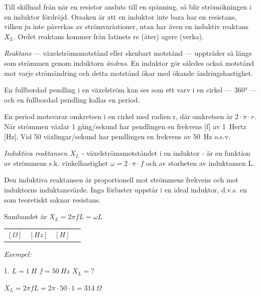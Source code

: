 Till skillnad från när en resistor ansluts till en spänning, så blir
strömökningen i en induktor fördröjd. Orsaken är att en induktor inte bara har
en resistans, vilken ju inte påverkas av strömvariationer, utan har även en
induktiv reaktans \(X_L\). Ordet reaktans kommer från latinets re (åter) agere
(verka).

\emph{Reaktans} --- växelströmsmotstånd eller skenbart motstånd --- uppträder så
länge som strömmen genom induktorn \emph{ändras}. En induktor gör således också
motstånd mot varje strömändring och detta motstånd ökar med ökande
ändringshastighet.

En fullbordad pendling i en växelström kan ses som ett varv i en cirkel --- 360° ---
och en fullbordad pendling kallas en period.

En period motsvarar omkretsen i en cirkel med radien r, där omkretsen är
\(2 \cdot π \cdot r\). När strömmen växlar 1 gång/sekund har
pendlingen en frekvens [f] av 1~Hertz [Hz]. Vid 50 växlingar/sekund har
pendlingen en frekvens av 50~Hz o.s.v.

\emph{Induktiva reaktansen \(X_L\)} - växelströmsmotståndet i en induktor - är
en funktion av strömmens s.k. vinkelhastighet \(\omega = 2 \cdot π \cdot f\) och
av storheten av induktansen L.

Den induktiva reaktansen är proportionell mot strömmens frekvens och mot
induktorns induktansvärde. Inga förluster uppstår i en ideal induktor, d.v.s. en
som teoretiskt saknar resistans.

Sambandet är
\(X_L = 2πfL = \omega L\)



\begin{tabular}{llll}
 \([\Omega]\) & \([Hz]\) & \([H]\)
 \end{tabular}

\emph{Exempel:}

1. \(L = 1\ H\) \(f = 50\ Hz\) \(X_L = ?\)

\(X_L = 2πfL = 2π \cdot 50 \cdot 1 = 314\ Ω\)

